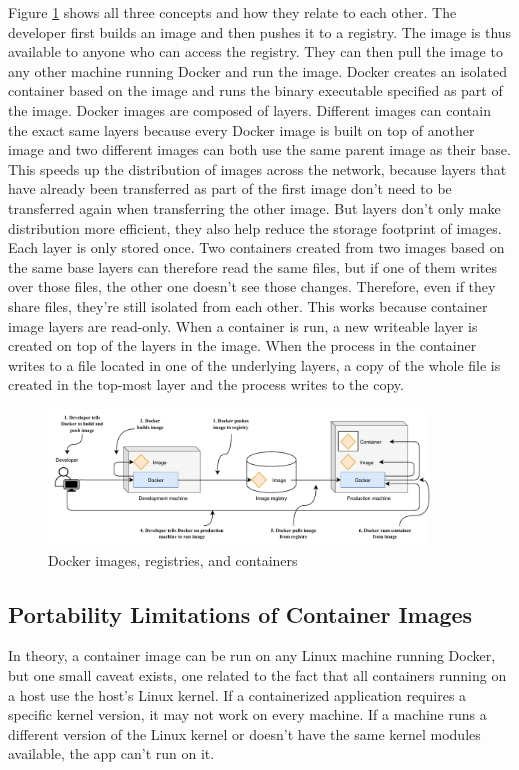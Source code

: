 Figure \ref{fig:dockerflow} shows all three concepts and how they relate to each other. The developer first builds an image and then pushes it to a registry. The image is thus available to anyone who can access the registry. They can then pull the image to any other machine running Docker and run the image. Docker creates an isolated container based on the image and runs the binary executable specified as part of the image.
Docker images are composed of layers. Different images can contain the exact same layers because every Docker image is built on top of another image and two different images can both use the same parent image as their base. This speeds up the distribution of images across the network, because layers that have already been transferred as part of the first image don’t need to be transferred again when transferring the other image.
But layers don’t only make distribution more efficient, they also help reduce the storage footprint of images. Each layer is only stored once. Two containers created from two images based on the same base layers can therefore read the same files, but if one of them writes over those files, the other one doesn't see those changes. Therefore, even if they share files, they’re still isolated from each other. This works because container image layers are read-only. When a container is run, a new writeable layer is created on top of the layers in the image. When the process in the container writes to a file located in one of the underlying layers, a copy of the whole file is created in the top-most layer and the process writes to the copy.

\begin{figure}[htbp]
	\centering
	\includegraphics[width=0.9\textwidth]{images/dockerflow.pdf}
	\caption{Docker images, registries, and containers}
	\label{fig:dockerflow}
\end{figure}

\subsection{Portability Limitations of Container Images}
In theory, a container image can be run on any Linux machine running Docker, but one small caveat exists, one related to the fact that all containers running on a host use the host’s Linux kernel. If a containerized application requires a specific kernel version, it may not work on every machine. If a machine runs a different version of the Linux kernel or doesn’t have the same kernel modules available, the app can’t run on it.

